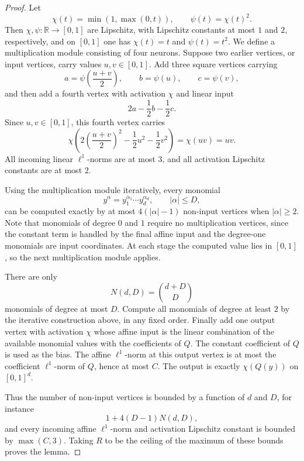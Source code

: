 \documentclass[11pt]{amsart}
\newcommand{\1}{\mathbf 1}
\begin{document}
\begin{proof}
Let
\[
        \chi(t)=\min(1,\max(0,t)),
        \qquad
        \psi(t)=\chi(t)^2 .
\]
Then \(\chi,\psi:\mathbb R\to[0,1]\) are Lipschitz, with Lipschitz constants at
most \(1\) and \(2\), respectively, and on \([0,1]\) one has
\(\chi(t)=t\) and \(\psi(t)=t^2\). We define a multiplication module consisting of four neurons. Suppose two earlier vertices,
or input vertices, carry values \(u,v\in[0,1]\).  Add three square vertices
carrying
\[
        a=\psi\left(\frac{u+v}{2}\right),\qquad
        b=\psi(u),\qquad
        c=\psi(v),
\]
and then add a fourth vertex with activation \(\chi\) and linear input
\[
        2a-\frac12 b-\frac12 c .
\]
Since \(u,v\in[0,1]\), this fourth vertex carries
\[
        \chi\left(2\left(\frac{u+v}{2}\right)^2-\frac12 u^2-\frac12 v^2\right)
        =
        \chi(uv)=uv .
\]
All incoming linear \(\ell^1\)-norms are at most \(3\), and all
activation Lipschitz constants are at most \(2\).

Using the multiplication module iteratively, every monomial
\[
        y^\alpha=y_1^{\alpha_1}\cdots y_d^{\alpha_d},
        \qquad |\alpha|\leq D,
\]
can be computed exactly by at most \(4(|\alpha|-1)\) non-input vertices when
\(|\alpha|\geq2\). Note that monomials of degree \(0\) and \(1\) require no multiplication
vertices, since the constant term is handled by the final affine input and the
degree-one monomials are input coordinates.  At each stage the computed value
lies in \([0,1]\), so the next multiplication module applies.

There are only
\[
        N(d,D)=\binom{d+D}{D}
\]
monomials of degree at most \(D\).  Compute all monomials of degree at least
\(2\) by the iterative construction above, in any fixed order.  Finally add one
output vertex with activation \(\chi\) whose affine input is the linear
combination of the available monomial values with the coefficients of \(Q\).
The constant coefficient of \(Q\) is used as the bias.  The affine
\(\ell^1\)-norm at this output vertex is at most the coefficient
\(\ell^1\)-norm of \(Q\), hence at most \(C\).  The output is exactly
\(\chi(Q(y))\) on \([0,1]^d\).

Thus the number of non-input vertices is bounded by a function of \(d\) and
\(D\), for instance
\[
        1+4(D-1)N(d,D),
\]
and every incoming affine \(\ell^1\)-norm and activation Lipschitz constant is
bounded by \(\max(C,3)\).  Taking \(R\) to be the ceiling of the maximum of
these bounds proves the lemma.
\end{proof}
\end{document}

